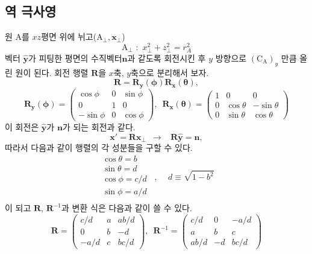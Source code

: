 \documentclass[chapter,a4paper,10pt]{oblivoir}
\begin{document}
\subsection{역 극사영}
원 A를 $xz$평면 위에 뉘고($\textrm{A}_\perp,\mathbf{x}_\perp$) 
\begin{equation}
\textrm{A}_\perp \,\,:\,\, x_\perp^2 + z_\perp^2 = r_A^2
\end{equation}
벡터 $\hat{\mathbf{y}}$가 피팅한 평면의 수직벡터$\mathbf{n}$과 같도록 회전시킨 후 
$y$ 방향으로 $(\textrm{C}_\textrm{A})_y$ 만큼 올린 원이 된다.
회전 행렬 $\mathbf{R}$을 $x$축, $y$축으로 분리해서 보자.
\begin{equation}
\mathbf{R} = \mathbf{R_y(\phi)}\mathbf{R_x(\theta)},
\end{equation}
\begin{equation}
\mathbf{R_y(\phi)} = \left( \begin{array}{ccc}
  \cos \phi & 0 & \sin \phi \\
  0 & 1 & 0 \\
  -\sin \phi & 0 & \cos \phi
\end{array} \right) ,\,\,\,
\mathbf{R_x(\theta)} = \left( \begin{array}{ccc}
  1 & 0 & 0 \\
  0 & \cos \theta & -\sin \theta \\
  0 & \sin \theta & \cos \theta
\end{array} \right)
\end{equation}
이 회전은 $\hat{\mathbf{y}}$가 $\mathbf{n}$가 되는 회전과 같다.
\begin{equation}
\mathbf x' = \mathbf R\mathbf x_\perp
\,\,\,\longrightarrow\,\,\,\,\,
\mathbf{R} \hat{\mathbf{y}} = \mathbf{n},
\end{equation}
따라서 다음과 같이 행렬의 각 성분들을 구할 수 있다.
\begin{equation}
\left. \begin{array}{ll}
\cos \theta = b \\
\sin \theta = d \\
\cos \phi = c/d \\
\sin \phi = a/d \\
\end{array}\right.
\,\,\,,\,\,\,\,\,\,\,d \equiv \sqrt{1-b^2}
\end{equation}
이 되고 $\mathbf{R}$, $\mathbf{R}^{-1}$과 변환 식은 다음과 같이 쓸 수 있다.
\begin{equation}
\mathbf{R} = \left( \begin{array}{ccc}
  c/d & a & ab/d \\
  0 & b & -d \\
  -a/d & c & bc/d
\end{array} \right)
,\,\,\,\mathbf{R}^{-1} = \left( \begin{array}{ccc}
  c/d & 0 & -a/d \\
  a & b & c \\
  ab/d & -d & bc/d
\end{array} \right)
\end{equation}
\end{document}
